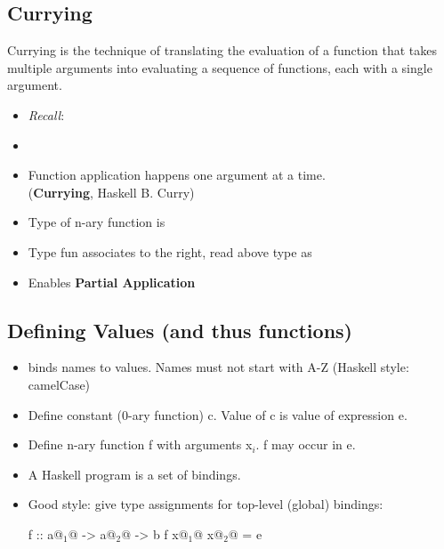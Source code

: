 \subsection{Currying}
Currying is the technique of translating the evaluation of a function that takes multiple arguments into evaluating a sequence of functions, each with a single argument.
\begin{multicols}{2}
\begin{itemize}
  \item \textit{Recall}: 
  \item {}
  \item Function application happens one argument at a time. \\ (\textbf{Currying}, Haskell B. Curry)
  \item Type of n-ary function is \\ 
  \item Type fun \codeline{->} associates to the right, read above type as \\ 
  \item Enables \textbf{Partial Application}
\end{itemize}
\end{multicols}


\subsection{Defining Values (and thus functions)}

\begin{itemize}
  \item \codeline{=} binds names to values. Names must not start with A-Z (Haskell style: camelCase)
  \item Define constant (0-ary function) c. Value of c is value of expression e. \\ 
  \item Define n-ary function f with arguments x$_i$. f may occur in e. \\ 
  \item A Haskell program is a set of bindings.
  \item Good style: give type assignments for top-level (global) bindings:\\
  \begin{Haskell}
f :: a@$_1$@ -> a@$_2$@ -> b
f x@$_1$@ x@$_2$@ = e
  \end{Haskell}
\end{itemize}

